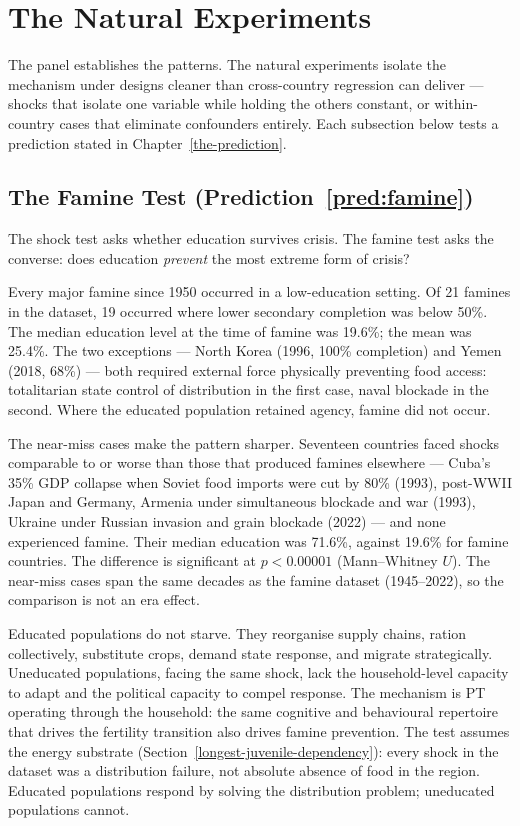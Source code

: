 \documentclass[12pt,letterpaper]{article}
\begin{document}
\section{The Natural Experiments}\label{natural-experiments}

The panel establishes the patterns. The natural experiments isolate
the mechanism under designs cleaner than cross-country regression can
deliver --- shocks that isolate one variable while holding the others
constant, or within-country cases that eliminate confounders
entirely. Each subsection below tests a prediction stated in
Chapter~\ref{the-prediction}.

\subsection{The Famine Test (Prediction~\ref{pred:famine})}\label{the-famine-test}

The shock test asks whether education survives crisis. The famine test asks the converse: does education \emph{prevent} the most extreme form of crisis?

Every major famine since 1950 occurred in a low-education setting. Of 21 famines in the dataset, 19 occurred where lower secondary completion was below 50\%. The median education level at the time of famine was 19.6\%; the mean was 25.4\%. The two exceptions --- North Korea (1996, 100\% completion) and Yemen (2018, 68\%) --- both required external force physically preventing food access: totalitarian state control of distribution in the first case, naval blockade in the second. Where the educated population retained agency, famine did not occur.

The near-miss cases make the pattern sharper. Seventeen countries faced shocks comparable to or worse than those that produced famines elsewhere --- Cuba's 35\% GDP collapse when Soviet food imports were cut by 80\% (1993), post-WWII Japan and Germany, Armenia under simultaneous blockade and war (1993), Ukraine under Russian invasion and grain blockade (2022) --- and none experienced famine. Their median education was 71.6\%, against 19.6\% for famine countries. The difference is significant at $p < 0.00001$ (Mann--Whitney $U$). The near-miss cases span the same decades as the famine dataset (1945--2022), so the comparison is not an era effect.

Educated populations do not starve. They reorganise supply chains, ration collectively, substitute crops, demand state response, and migrate strategically. Uneducated populations, facing the same shock, lack the household-level capacity to adapt and the political capacity to compel response. The mechanism is PT operating through the household: the same cognitive and behavioural repertoire that drives the fertility transition also drives famine prevention. The test assumes the energy substrate (Section~\ref{longest-juvenile-dependency}): every shock in the dataset was a distribution failure, not absolute absence of food in the region. Educated populations respond by solving the distribution problem; uneducated populations cannot.
\end{document}
